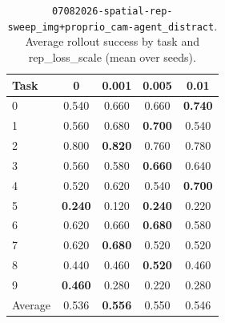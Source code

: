 \begin{table}
\caption{\texttt{07082026-spatial-rep-sweep\_img+proprio\_cam-agent\_distract}. Average rollout success by task and rep\_loss\_scale (mean over seeds).}
\label{tab:07082026_spatial_rep_sweep_img_proprio_cam_agent_distract_rep_loss_success}
\begin{tabular}{lcccc}
\toprule
Task & 0 & 0.001 & 0.005 & 0.01 \\
\midrule
0 & 0.540 & 0.660 & 0.660 & \textbf{0.740} \\
1 & 0.560 & 0.680 & \textbf{0.700} & 0.540 \\
2 & 0.800 & \textbf{0.820} & 0.760 & 0.780 \\
3 & 0.560 & 0.580 & \textbf{0.660} & 0.640 \\
4 & 0.520 & 0.620 & 0.540 & \textbf{0.700} \\
5 & \textbf{0.240} & 0.120 & \textbf{0.240} & 0.220 \\
6 & 0.620 & 0.660 & \textbf{0.680} & 0.580 \\
7 & 0.620 & \textbf{0.680} & 0.520 & 0.520 \\
8 & 0.440 & 0.460 & \textbf{0.520} & 0.460 \\
9 & \textbf{0.460} & 0.280 & 0.220 & 0.280 \\
\midrule
Average & 0.536 & \textbf{0.556} & 0.550 & 0.546 \\
\bottomrule
\end{tabular}
\end{table}



